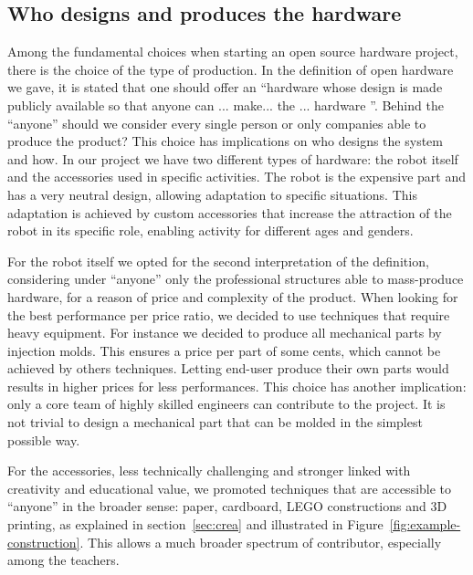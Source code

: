 \documentclass[letterpaper, 10 pt, conference]{ieeeconf}  %
\begin{document}
\subsection{Who designs and produces the hardware}

Among the fundamental choices when starting an open source hardware project, there is the choice of the type of production. 
In the definition of open hardware we gave, it is stated that one should offer an ``hardware whose design is made publicly available so that anyone can ... make... the ... hardware ''.
Behind the ``anyone'' should we consider every single person or only companies able to produce the product?
This choice has implications on who designs the system and how.
In our project we have two different types of hardware: the robot itself and the accessories used in specific activities.
The robot is the expensive part and has a very neutral design, allowing adaptation to specific situations.
This adaptation is achieved by custom accessories that increase the attraction of the robot in its specific role, enabling activity for different ages and genders.

For the robot itself we opted for the second interpretation of the definition, considering under ``anyone'' only the professional structures able to mass-produce hardware, for a reason of price and complexity of the product. 
When looking for the best performance per price ratio, we decided to use techniques that require heavy equipment.
For instance we decided to produce all mechanical parts by injection molds. 
This ensures a price per part of some cents, which cannot be achieved by others techniques.
Letting end-user produce their own parts would results in higher prices for less performances. 
This choice has another implication: only a core team of highly skilled engineers can contribute to the project. 
It is not trivial to design a mechanical part that can be molded in the simplest possible way.

For the accessories, less technically challenging and stronger linked with creativity and educational value, we promoted techniques that are accessible to ``anyone'' in the broader sense: paper, cardboard, LEGO constructions and 3D printing, as explained in section~\ref{sec:crea} and illustrated in Figure~\ref{fig:example-construction}.
This allows a much broader spectrum of contributor, especially among the teachers.
\end{document}
